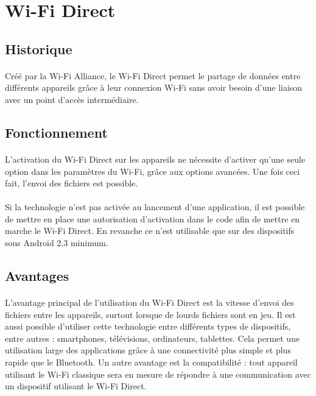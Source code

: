 \documentclass[a4paper,10pt]{report}
\begin{document}
  \section{Wi-Fi Direct}
    \subsection{Historique}
      \paragraph{}
      Créé par la Wi-Fi Alliance, le Wi-Fi Direct permet le partage de données entre différents appareils grâce à leur connexion Wi-Fi sans avoir besoin d'une liaison avec un point d'accès intermédiaire.
    \subsection{Fonctionnement}
     \paragraph{}
    L'activation du Wi-Fi Direct sur les appareils ne nécessite d'activer qu'une seule option dans les paramètres du Wi-Fi, grâce aux options avancées. Une fois ceci fait, l'envoi des fichiers est possible.
    \paragraph{}
    Si la technologie n'est pas activée au lancement d'une application, il est possible de mettre en place une autorisation d'activation dans le code afin de mettre en marche le Wi-Fi Direct. En revanche ce n'est utilisable que sur des dispositifs sous Android 2.3 minimum.
    \subsection{Avantages}
     \paragraph{}
     L'avantage principal de l'utilisation du Wi-Fi Direct est la vitesse d'envoi des fichiers entre les appareils, surtout lorsque de lourds fichiers sont en jeu. 
     Il est aussi possible d'utiliser cette technologie entre différents types de dispositifs, entre autres : smartphones, télévisions, ordinateurs, tablettes. Cela permet une utilisation large des applications grâce à une connectivité plus simple et plus rapide que le Bluetooth. Un autre avantage est la compatibilité : tout appareil utilisant le Wi-Fi classique sera en mesure de répondre à une communication avec un dispositif utilisant le Wi-Fi Direct.
\end{document}
